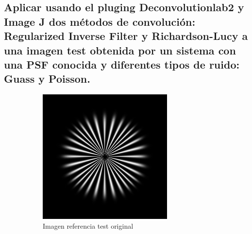 \documentclass{./packages/optica-article}
\begin{document}
\subsection{Aplicar usando el pluging Deconvolutionlab2 y Image J dos métodos de convolución: Regularized Inverse Filter y Richardson-Lucy a una imagen test obtenida por un sistema con una PSF conocida y diferentes tipos de ruido: Guass y Poisson.}


\begin{figure}[hbp]
	\centering
	\begin{subfigure}[t]{0.45\textwidth}\centering
		\centering
		\includegraphics[width=\textwidth]{Simulation deconvolution/ref.jpg}
		\caption{Imagen referencia test original}\label{fig:ref}
	\end{subfigure}
	\hfill
	\begin{subfigure}[t]{0.45\textwidth}\centering

\end{subfigure}
\end{figure}
\end{document}
